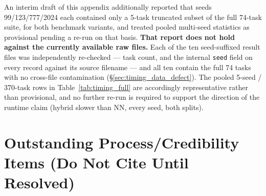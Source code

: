 \documentclass[twoside,11pt]{article}
\begin{document}
An interim draft of this appendix additionally reported that seeds
99/123/777/2024 each contained only a 5-task truncated subset of the full
74-task suite, for both benchmark variants, and treated pooled multi-seed
statistics as provisional pending a re-run on that basis. \textbf{That
report does not hold against the currently available raw files.} Each of
the ten seed-suffixed result files was independently re-checked --- task
count, and the internal \texttt{seed} field on every record against its
source filename --- and all ten contain the full 74 tasks with no
cross-file contamination (\S\ref{sec:timing_data_defect}). The pooled
5-seed / 370-task rows in Table~\ref{tab:timing_full} are accordingly
representative rather than provisional, and no further re-run is required
to support the direction of the runtime claim (hybrid slower than NN,
every seed, both splits).

\section{Outstanding Process/Credibility Items (Do Not Cite Until Resolved)}\label{sec:process_items}
\end{document}
